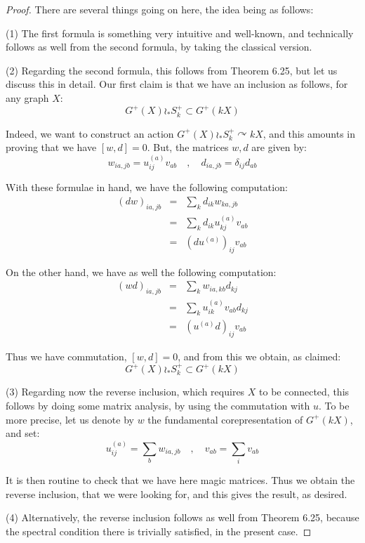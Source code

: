 \documentclass[12pt]{amsbook}
\begin{document}
\begin{proof}
There are several things going on here, the idea being as follows:

\medskip

(1) The first formula is something very intuitive and well-known, and technically follows as well from the second formula, by taking the classical version. 

\medskip

(2) Regarding the second formula, this follows from Theorem 6.25, but let us discuss this in detail. Our first claim is that we have an inclusion as follows, for any graph $X$:
$$G^+(X)\wr_*S_k^+\subset G^+(kX)$$

Indeed, we want to construct an action $G^+(X)\wr_*S_k^+\curvearrowright kX$, and this amounts in proving that we have $[w,d]=0$. But, the matrices $w,d$ are given by:
$$w_{ia,jb}=u_{ij}^{(a)}v_{ab}\quad,\quad d_{ia,jb}=\delta_{ij}d_{ab}$$

With these formulae in hand, we have the following computation:
\begin{eqnarray*}
(dw)_{ia,jb}
&=&\sum_kd_{ik}w_{ka,jb}\\
&=&\sum_kd_{ik}u_{kj}^{(a)}v_{ab}\\
&=&(du^{(a)})_{ij}v_{ab}
\end{eqnarray*}

On the other hand, we have as well the following computation:
\begin{eqnarray*}
(wd)_{ia,jb}
&=&\sum_kw_{ia,kb}d_{kj}\\
&=&\sum_ku_{ik}^{(a)}v_{ab}d_{kj}\\
&=&(u^{(a)}d)_{ij}v_{ab}
\end{eqnarray*}

Thus we have commutation, $[w,d]=0$, and from this we obtain, as claimed:
$$G^+(X)\wr_*S_k^+\subset G^+(kX)$$

(3) Regarding now the reverse inclusion, which requires $X$ to be connected, this follows by doing some matrix analysis, by using the commutation with $u$. To be more precise, let us denote by $w$ the fundamental corepresentation of $G^+(kX)$, and set:
$$u_{ij}^{(a)}=\sum_bw_{ia,jb}\quad,\quad 
v_{ab}=\sum_iv_{ab}$$

It is then routine to check that we have here magic matrices. Thus we obtain the reverse inclusion, that we were looking for, and this gives the result, as desired.

\medskip

(4) Alternatively, the reverse inclusion follows as well from Theorem 6.25, because the spectral condition there is trivially satisfied, in the present case.
\end{proof}
\end{document}
